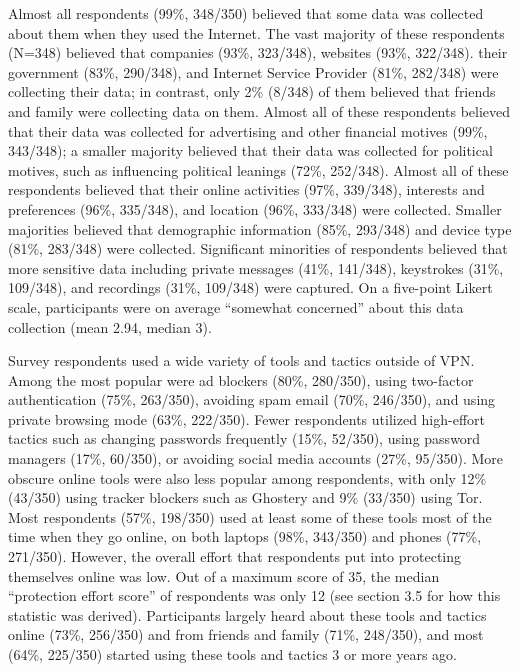 Almost all respondents (99\%, 348/350) believed that some data was collected about them when they used the Internet. The vast majority of these respondents (N=348) believed that companies (93\%, 323/348), websites (93\%, 322/348). their government (83\%, 290/348), and Internet Service Provider (81\%, 282/348) were collecting their data; in contrast, only 2\% (8/348) of them believed that friends and family were collecting data on them. Almost all of these respondents believed that their data was collected for advertising and other financial motives (99\%, 343/348); a smaller majority believed that their data was collected for political motives, such as influencing political leanings (72\%, 252/348). Almost all of these respondents believed that their online activities (97\%, 339/348), interests and preferences (96\%, 335/348), and location (96\%, 333/348) were collected. Smaller majorities believed that demographic information (85\%, 293/348) and device type (81\%, 283/348) were collected. Significant minorities of respondents believed that more sensitive data including private messages (41\%, 141/348), keystrokes (31\%, 109/348), and recordings (31\%, 109/348) were captured. On a five-point Likert scale, participants were on average “somewhat concerned” about this data collection (mean 2.94, median 3).

Survey respondents used a wide variety of tools and tactics outside of VPN. Among the most popular were ad blockers (80\%, 280/350), using two-factor authentication (75\%, 263/350), avoiding spam email (70\%, 246/350), and using private browsing mode (63\%, 222/350). Fewer respondents utilized high-effort tactics such as changing passwords frequently (15\%, 52/350), using password managers (17\%, 60/350), or avoiding social media accounts (27\%, 95/350). More obscure online tools were also less popular among respondents, with only 12\% (43/350) using tracker blockers such as Ghostery and 9\% (33/350) using Tor. Most respondents (57\%, 198/350) used at least some of these tools most of the time when they go online, on both laptops (98\%, 343/350) and phones (77\%, 271/350). However, the overall effort that respondents put into protecting themselves online was low. Out of a maximum score of 35, the median “protection effort score” of respondents was only 12 (see section 3.5 for how this statistic was derived). Participants largely heard about these tools and tactics online (73\%, 256/350) and from friends and family (71\%, 248/350), and most (64\%, 225/350) started using these tools and tactics 3 or more years ago.

